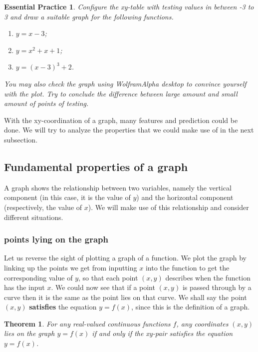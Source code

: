 \documentclass[12pt]{article}
\newtheorem*{theorem}{Theorem}
\newtheorem{exercise}{Essential Practice}[subsection]
\begin{document}
    \begin{exercise}
        Configure the xy-table with testing values in between -3 to 3 and draw a suitable graph for the following functions.\begin{enumerate}
            \item $y=x-3$;
            \item $y=x^2+x+1$;
            \item $y=(x-3)^3+2$.
        \end{enumerate}
        You may also check the graph using WolframAlpha desktop to convince yourself with the plot. Try to conclude the difference between large amount and small amount of points of testing.
    \end{exercise}

    With the xy-coordination of a graph, many features and prediction could be done. We will try to analyze the properties that we could make use of in the next subsection.

    \subsection{Fundamental properties of a graph}

    A graph shows the relationship between two variables, namely the vertical component (in this case, it is the value of $y$) and the horizontal component (respectively, the value of $x$). We will make use of this relationship and consider different situations.

    \subsubsection*{points lying on the graph}

    Let us reverse the sight of plotting a graph of a function. We plot the graph by linking up the points we get from inputting $x$ into the function to get the corresponding value of $y$, so that each point $(x,y)$ describes when the function has the input $x$. We could now see that if a point $(x,y)$ is passed through by a curve then it is the same as the point lies on that curve. We shall say the point $(x,y)$ \textbf{satisfies} the equation $y=f(x)$, since this is the definition of a graph.

    \begin{theorem}
        For any real-valued continuous functions $f$, any coordinates $(x,y)$ lies on the graph $y=f(x)$ if and only if the xy-pair satisfies the equation $y=f(x)$.
    \end{theorem}
\end{document}
